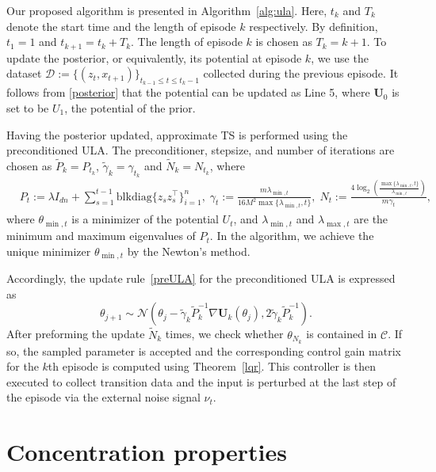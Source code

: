 \documentclass[11pt]{article}
\theoremstyle{plain}
\theoremstyle{definition}
\theoremstyle{remark}
\begin{document}
Our proposed algorithm is presented in Algorithm~\ref{alg:ula}.
Here, $t_k$ and $T_k$ denote the start time and the length of episode $k$ respectively. By  definition, $t_1=1$ and $t_{k+1} = t_k + T_k$. The length of episode $k$ is chosen as $T_k = k+1$.
To update the posterior, or equivalently, its potential at episode $k$, we use the dataset $\mathcal{D}:= \{(z_t, x_{t+1})\}_{t_{k-1} \leq t \leq t_{k} - 1}$ collected during the previous episode. 
It follows from \eqref{posterior} that the potential can be updated  as Line 5,
where $\mathbf{U}_0$ is set to be  $U_1$, the potential of the prior.

Having the posterior updated, approximate TS is performed using the preconditioned ULA. 
The preconditioner, stepsize, and number of iterations are chosen as $\tilde{P}_{k}= {P}_{t_k}$, $\tilde{\gamma}_k={\gamma}_{t_k}$ and $\tilde{N}_k={N}_{t_k}$, where
\begin{equation}\label{preconditioner_stepsize_iteration}
     \begin{split}
     &{P}_{t}:=\lambda I_{dn} + \sum_{s=1}^{t-1} \mathrm{blkdiag}\{z_sz_s^\top\}_{i=1}^n, \; {\gamma}_t := \frac{m \lambda_{\min,t}}{16 M^2 \max\{\lambda_{\min,t},t \}}, \;  {N}_t := \frac{4\log_2 (\frac{\max\{\lambda_{\min,t},t\}}{\lambda_{\min,t}})}{m \gamma_t},
     \end{split}
\end{equation}
where $\theta_{\min, t}$ is a minimizer of the potential $U_t$, and $\lambda_{\min,t}$ and $\lambda_{\max,t}$ are the minimum and maximum eigenvalues of ${P}_t$. In the algorithm, we achieve the unique minimizer $\theta_{\min, t}$ by the Newton's method.

Accordingly, the update rule~\eqref{preULA} for the preconditioned ULA is expressed as
\begin{equation}\label{ULAstep}
\theta_{j+1} \sim \mathcal{N} ( \theta_j - \tilde{\gamma}_k \tilde{P}_k^{-1} \nabla \mathbf{U}_k (\theta_j), 2\tilde{\gamma}_k \tilde{P}_k^{-1}).
\end{equation}
After preforming the update $\tilde{N}_k$ times, we check whether $\theta_{N_k}$ is contained in $\mathcal{C}$. 
If so, the sampled parameter is accepted and the corresponding control gain matrix for the $k$th episode is computed using Theorem~\ref{lqr}.
This controller is then executed to collect transition data and the input is perturbed at the last step of the episode via the external noise signal $\nu_t$. 


\section{Concentration properties}
\end{document}
